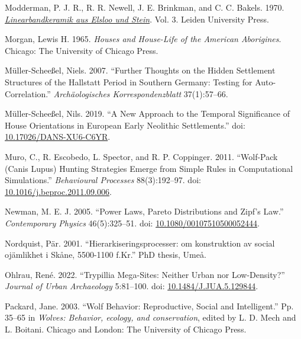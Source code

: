 \documentclass[
  12pt,
]{book}
\newlength{\cslhangindent}
\newlength{\cslentryspacingunit} %
\newenvironment{CSLReferences}[2] %
 {%
  \setlength{\parindent}{0pt}
  \ifodd #1
  \let\oldpar\par
  \def\par{\hangindent=\cslhangindent\oldpar}
  \fi
  \setlength{\parskip}{#2\cslentryspacingunit}
 }%
 {}
\begin{document}
\begin{CSLReferences}{1}{0}
\leavevmode{}%
Modderman, P. J. R., R. R. Newell, J. E. Brinkman, and C. C. Bakels. 1970. \emph{\href{http://hdl.handle.net/1887/2720923}{Linearbandkeramik aus Elsloo und Stein}}. Vol. 3. Leiden University Press.

\leavevmode{}%
Morgan, Lewis H. 1965. \emph{Houses and House-Life of the American Aborigines}. Chicago: The University of Chicago Press.

\leavevmode{}%
Müller-Scheeßel, Niels. 2007. {``Further Thoughts on the Hidden Settlement Structures of the Hallstatt Period in Southern Germany: Testing for Auto-Correlation.''} \emph{Archäologisches Korrespondenzblatt} 37(1):57--66.

\leavevmode{}%
Müller-Scheeßel, Nils. 2019. {``A New Approach to the Temporal Significance of House Orientations in European Early Neolithic Settlements.''} doi: \href{https://doi.org/10.17026/DANS-XU6-C6YR}{10.17026/DANS-XU6-C6YR}.

\leavevmode{}%
Muro, C., R. Escobedo, L. Spector, and R. P. Coppinger. 2011. {``Wolf-Pack (Canis Lupus) Hunting Strategies Emerge from Simple Rules in Computational Simulations.''} \emph{Behavioural Processes} 88(3):192--97. doi: \href{https://doi.org/10.1016/j.beproc.2011.09.006}{10.1016/j.beproc.2011.09.006}.

\leavevmode{}%
Newman, M. E. J. 2005. {``Power Laws, Pareto Distributions and Zipf's Law.''} \emph{Contemporary Physics} 46(5):325--51. doi: \href{https://doi.org/10.1080/00107510500052444}{10.1080/00107510500052444}.

\leavevmode{}%
Nordquist, Pär. 2001. {``Hierarkiseringsprocesser: om konstruktion av social ojämlikhet i Skåne, 5500-1100 f.Kr.''} PhD thesis, Umeå.

\leavevmode{}%
Ohlrau, René. 2022. {``Trypillia Mega-Sites: Neither Urban nor Low-Density?''} \emph{Journal of Urban Archaeology} 5:81--100. doi: \href{https://doi.org/10.1484/J.JUA.5.129844}{10.1484/J.JUA.5.129844}.

\leavevmode{}%
Packard, Jane. 2003. {``Wolf Behavior: Reproductive, Social and Intelligent.''} Pp. 35--65 in \emph{Wolves: Behavior, ecology, and conservation}, edited by L. D. Mech and L. Boitani. {Chicago and London}: {The University of Chicago Press}.


\end{CSLReferences}
\end{document}
